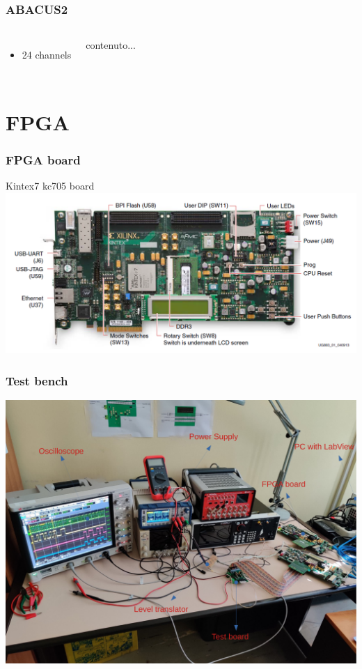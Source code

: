 \documentclass[aspectratio=169]{beamer}
\begin{document}
	\begin{frame}
	\frametitle{ABACUS2}
		\begin{columns}
			\begin{itemize}
				\item 24 channels
			\end{itemize}
			\begin{center}
				contenuto...
			\end{center}
		\end{columns}
	\end{frame}

	\section{FPGA}
	
	\begin{frame}
	\frametitle{FPGA board }
	\begin{center}
		Kintex7 kc705 board
		\includegraphics[width=0.85 \textwidth]{IMG/Kintex7_board.PNG}
	\end{center}
	\end{frame}

	\begin{frame}
	\frametitle{Test bench}
	\begin{center}
		\includegraphics[width=0.65 \textwidth]{IMG/TestBench.pdf}
	\end{center}
	\end{frame}
\end{document}
